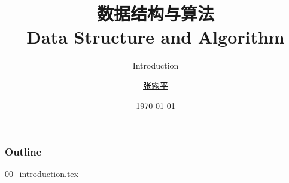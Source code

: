 \documentclass{beamer}
\title{数据结构与算法\\ Data Structure and Algorithm}
\subtitle{Introduction}
\author{\href{mailto:zlp@upc.edu.cn}{张露平}}
\date{\today}
\begin{document}
\maketitle

\begin{frame}
    \frametitle{Outline}

    \tableofcontents

\end{frame}

{00_introduction.tex}

\backmatter
\end{document}
